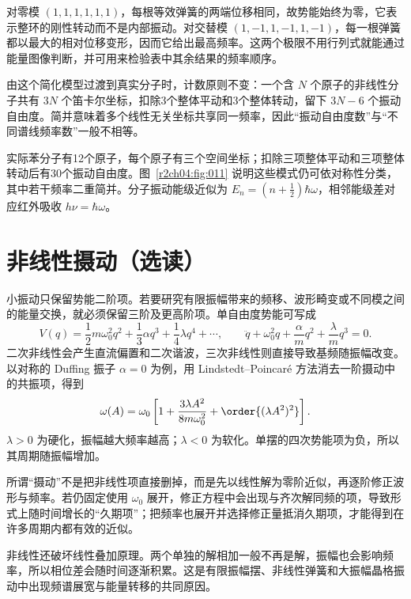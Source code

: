 对零模 $(1,1,1,1,1,1)$，每根等效弹簧的两端位移相同，故势能始终为零，它表示整环的刚性转动而不是内部振动。对交替模 $(1,-1,1,-1,1,-1)$，每一根弹簧都以最大的相对位移变形，因而它给出最高频率。这两个极限不用行列式就能通过能量图像判断，并可用来检验表中其余结果的频率顺序。

由这个简化模型过渡到真实分子时，计数原则不变：一个含 $N$ 个原子的非线性分子共有 $3N$ 个笛卡尔坐标，扣除3个整体平动和3个整体转动，留下 $3N-6$ 个振动自由度。简并意味着多个线性无关坐标共享同一频率，因此“振动自由度数”与“不同谱线频率数”一般不相等。

\clearpage
实际苯分子有12个原子，每个原子有三个空间坐标；扣除三项整体平动和三项整体转动后有30个振动自由度。图~\ref{r2ch04:fig:011} 说明这些模式仍可依对称性分类，其中若干频率二重简并。分子振动能级近似为 $E_n=(n+\tfrac12)\hbar\omega$，相邻能级差对应红外吸收 $h\nu=\hbar\omega$。
\figBenzeneModeTable

\section{非线性摄动（选读）}
\label{r2ch04:sec:nonlinear}

小振动只保留势能二阶项。若要研究有限振幅带来的频移、波形畸变或不同模之间的能量交换，就必须保留三阶及更高阶项。单自由度势能可写成
\begin{equation}
 V(q)=\frac12m\omega_0^2q^2+\frac13\alpha q^3+\frac14\lambda q^4+\cdots,
 \qquad
 \ddot q+\omega_0^2q+\frac\alpha m q^2+\frac\lambda m q^3=0.
 \label{r2ch04:eq:029}
\end{equation}
二次非线性会产生直流偏置和二次谐波，三次非线性则直接导致基频随振幅改变。以对称的 Duffing 振子 $\alpha=0$ 为例，用 Lindstedt--Poincaré 方法消去一阶摄动中的共振项，得到
\begin{equation}
 \omega(A)=\omega_0\left[1+\frac{3\lambda A^2}{8m\omega_0^2}+\order{(\lambda A^2)^2}\right].
 \label{r2ch04:eq:030}
\end{equation}
$\lambda>0$ 为硬化，振幅越大频率越高；$\lambda<0$ 为软化。单摆的四次势能项为负，所以其周期随振幅增加。

所谓“摄动”不是把非线性项直接删掉，而是先以线性解为零阶近似，再逐阶修正波形与频率。若仍固定使用 $\omega_0$ 展开，修正方程中会出现与齐次解同频的项，导致形式上随时间增长的“久期项”；把频率也展开并选择修正量抵消久期项，才能得到在许多周期内都有效的近似。

非线性还破坏线性叠加原理。两个单独的解相加一般不再是解，振幅也会影响频率，所以相位差会随时间逐渐积累。这是有限振幅摆、非线性弹簧和大振幅晶格振动中出现频谱展宽与能量转移的共同原因。

